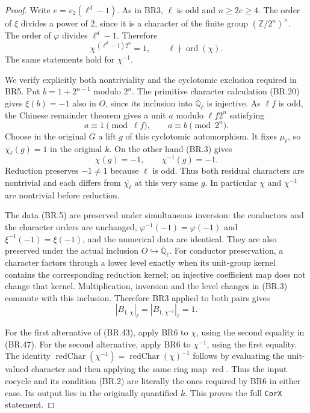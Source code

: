 \begin{proof}
Write $e=v_2(\ell^d-1)$.  As in BR3,
$\ell$ is odd and $n\ge2e\ge4$.
The order of $\xi$ divides a power of $2$, since it is a
character of the finite group $(\mathbb Z/2^n)^\times$.
The order of $\varphi$ divides $\ell^d-1$.
Therefore
\[
                \chi^{\,(\ell^d-1)2^n}=1,
                \qquad \ell\nmid\operatorname{ord}(\chi).
                \tag{BR.44}
\]
The same statements hold for $\chi^{-1}$.

We verify explicitly both nontriviality and the cyclotomic exclusion
required in BR5.  Put $b=1+2^{n-1}$ modulo $2^n$.
The primitive character calculation (BR.20) gives $\xi(b)=-1$
also in $O$, since its inclusion into
$\overline{\mathbb Q}_\ell$ is injective.
As $\ell f$ is odd, the Chinese remainder theorem gives a unit
$a$ modulo $\ell f2^n$ satisfying
\[
                   a\equiv1\pmod{\ell f},
                   \qquad a\equiv b\pmod{2^n}.
                   \tag{BR.45}
\]
Choose in the original $G$ a lift $g$ of this cyclotomic
automorphism.  It fixes $\mu_\ell$, so
$\overline{\chi_\ell}(g)=1$ in the original $k$.
On the other hand (BR.3) gives
\[
                 \chi(g)=-1,\qquad \chi^{-1}(g)=-1.
                 \tag{BR.46}
\]
Reduction preserves $-1\ne1$ because $\ell$ is odd.
Thus both residual characters are nontrivial and each differs
from $\overline{\chi_\ell}$ at this very same $g$.
In particular $\chi$ and $\chi^{-1}$ are nontrivial before reduction.

The data (BR.5) are preserved under simultaneous inversion:
the conductors and the character orders are unchanged,
$\varphi^{-1}(-1)=\varphi(-1)$ and
$\xi^{-1}(-1)=\xi(-1)$, and the numerical data are identical.
They are also preserved under the actual inclusion
$O\hookrightarrow\overline{\mathbb Q}_\ell$.
For conductor preservation, a character factors through a lower
level exactly when its unit-group kernel contains the corresponding
reduction kernel; an injective coefficient map does not change that
kernel.  Multiplication, inversion and the level changes in
(BR.3) commute with this inclusion.  Therefore BR3 applied to
both pairs gives
\[
                         |B_{1,\chi}|_\ell
                         =|B_{1,\chi^{-1}}|_\ell=1.
                         \tag{BR.47}
\]

For the first alternative of (BR.43), apply BR6 to $\chi$,
using the second equality in (BR.47).  For the second alternative,
apply BR6 to $\chi^{-1}$, using the first equality.
The identity
$\operatorname{redChar}(\chi^{-1})
 =\operatorname{redChar}(\chi)^{-1}$
follows by evaluating the unit-valued character and then applying
the same ring map $\operatorname{red}$.
Thus the input cocycle and its condition (BR.2) are literally
the ones required by BR6 in either case.
Its output lies in the originally quantified $k$.
This proves the full \texttt{CorX} statement.
\end{proof}


